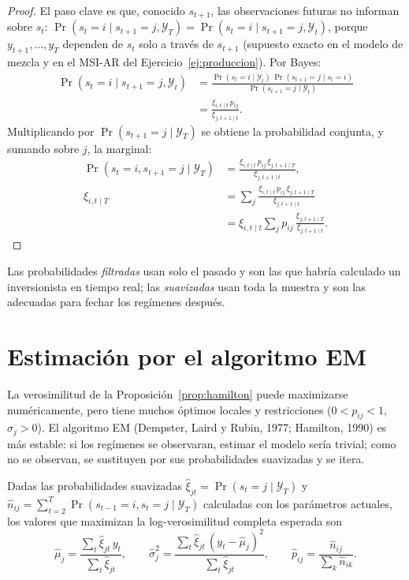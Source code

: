\begin{proof}
El paso clave es que, conocido $s_{t+1}$, las observaciones futuras no informan sobre $s_t$:
$\Pr(s_t=i\mid s_{t+1}=j,\mathcal Y_T)=\Pr(s_t=i\mid s_{t+1}=j,\mathcal Y_t)$, porque $y_{t+1},\dots,y_T$ dependen de $s_t$ solo
a través de $s_{t+1}$ (supuesto exacto en el modelo de mezcla y en el MSI-AR del Ejercicio~\ref{ej:produccion}). Por Bayes:
\begin{align*}
  \Pr(s_t=i\mid s_{t+1}=j,\mathcal Y_t) &= \frac{\Pr(s_t=i\mid\mathcal Y_t)\,\Pr(s_{t+1}=j\mid s_t=i)}{\Pr(s_{t+1}=j\mid\mathcal Y_t)}\\
                                         &= \frac{\xi_{i,t\mid t}\,p_{ij}}{\xi_{j,t+1\mid t}}.
\end{align*}
Multiplicando por $\Pr(s_{t+1}=j\mid\mathcal Y_T)$ se obtiene la probabilidad conjunta, y sumando sobre $j$, la marginal:
\begin{align*}
  \Pr(s_t=i,s_{t+1}=j\mid\mathcal Y_T) &= \frac{\xi_{i,t\mid t}\,p_{ij}\,\xi_{j,t+1\mid T}}{\xi_{j,t+1\mid t}},\\
  \xi_{i,t\mid T} &= \sum_j\frac{\xi_{i,t\mid t}\,p_{ij}\,\xi_{j,t+1\mid T}}{\xi_{j,t+1\mid t}}\\
                  &= \xi_{i,t\mid t}\sum_jp_{ij}\,\frac{\xi_{j,t+1\mid T}}{\xi_{j,t+1\mid t}}.
\end{align*}
\end{proof}

Las probabilidades \emph{filtradas} usan solo el pasado y son las que habría calculado un inversionista en tiempo
real; las \emph{suavizadas} usan toda la muestra y son las adecuadas para fechar los regímenes después.

\section{Estimación por el algoritmo EM}

La verosimilitud de la Proposición~\ref{prop:hamilton} puede maximizarse numéricamente, pero tiene muchos óptimos
locales y restricciones ($0<p_{ij}<1$, $\sigma_j>0$). El algoritmo EM (Dempster, Laird y Rubin, 1977; Hamilton, 1990)
es más estable: si los regímenes se observaran, estimar el modelo sería trivial; como no se observan, se sustituyen
por sus probabilidades suavizadas y se itera.

\begin{proposicion}\label{prop:em}
Dadas las probabilidades suavizadas $\hat\xi_{jt}=\Pr(s_t=j\mid\mathcal Y_T)$ y
$\hat n_{ij}=\sum_{t=2}^T\Pr(s_{t-1}=i,s_t=j\mid\mathcal Y_T)$ calculadas con los parámetros actuales, los valores que
maximizan la log-verosimilitud completa esperada son
\[
  \hat\mu_j=\frac{\sum_t\hat\xi_{jt}\,y_t}{\sum_t\hat\xi_{jt}},\qquad
  \hat\sigma_j^2=\frac{\sum_t\hat\xi_{jt}\,(y_t-\hat\mu_j)^2}{\sum_t\hat\xi_{jt}},\qquad
  \hat p_{ij}=\frac{\hat n_{ij}}{\sum_k\hat n_{ik}} .
\]
\end{proposicion}

